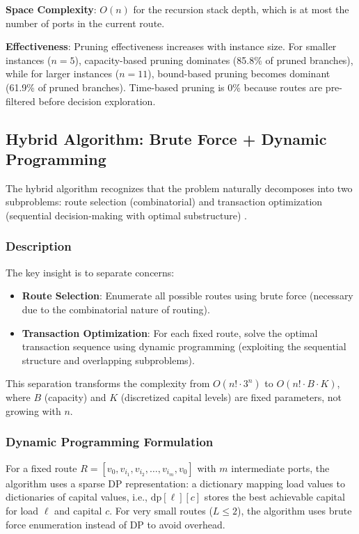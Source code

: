 \documentclass[12pt]{article}
\begin{document}
\textbf{Space Complexity}: $O(n)$ for the recursion stack depth, which is at most the number of ports in the current route.

\textbf{Effectiveness}: Pruning effectiveness increases with instance size. For smaller instances ($n=5$), capacity-based pruning dominates (85.8\% of pruned branches), while for larger instances ($n=11$), bound-based pruning becomes dominant (61.9\% of pruned branches). Time-based pruning is 0\% because routes are pre-filtered before decision exploration.

\subsection{Hybrid Algorithm: Brute Force + Dynamic Programming}
\label{subsec:hybrid}

The hybrid algorithm recognizes that the problem naturally decomposes into two subproblems: route selection (combinatorial) and transaction optimization (sequential decision-making with optimal substructure) \cite{bellman1957}.

\subsubsection{Description}

The key insight is to separate concerns:
\begin{itemize}
    \item \textbf{Route Selection}: Enumerate all possible routes using brute force (necessary due to the combinatorial nature of routing).
    \item \textbf{Transaction Optimization}: For each fixed route, solve the optimal transaction sequence using dynamic programming (exploiting the sequential structure and overlapping subproblems).
\end{itemize}

This separation transforms the complexity from $O(n! \cdot 3^n)$ to $O(n! \cdot B \cdot K)$, where $B$ (capacity) and $K$ (discretized capital levels) are fixed parameters, not growing with $n$.

\subsubsection{Dynamic Programming Formulation}

For a fixed route $R = [v_0, v_{i_1}, v_{i_2}, \ldots, v_{i_m}, v_0]$ with $m$ intermediate ports, the algorithm uses a sparse DP representation: a dictionary mapping load values to dictionaries of capital values, i.e., $\text{dp}[\ell][c]$ stores the best achievable capital for load $\ell$ and capital $c$. For very small routes ($L \leq 2$), the algorithm uses brute force enumeration instead of DP to avoid overhead.
\end{document}
